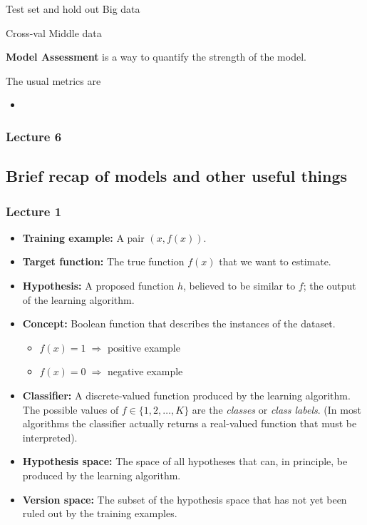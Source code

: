 \vspace{10pt}

Test set and hold out \ra Big data

Cross-val \ra Middle data

\textbf{Model Assessment} is a way to quantify the strength of the model.

The usual metrics are

\begin{itemize}
    \item 
\end{itemize}


\subsubsection{Lecture 6}













\subsection{Brief recap of models and other useful things}

\subsubsection{Lecture 1}

\begin{itemize}
    \item \textbf{Training example:} A pair $(x, f(x))$.
    \item \textbf{Target function:} The true function $f(x)$ that we want to estimate.
    \item \textbf{Hypothesis:} A proposed function $h$, believed to be similar to $f$; the output of the learning algorithm.
    \item \textbf{Concept:} Boolean function that describes the instances of the dataset.
          \begin{itemize}
              \item $f(x) = 1 \;\Rightarrow$ positive example
              \item $f(x) = 0 \;\Rightarrow$ negative example 
          \end{itemize}
    \item \textbf{Classifier:} A discrete-valued function produced by the learning algorithm.  
          The possible values of $f \in \{1,2,\dots,K\}$ are the \emph{classes} or \emph{class labels}.  
          (In most algorithms the classifier actually returns a real-valued function that must be interpreted).
    \item \textbf{Hypothesis space:} The space of all hypotheses that can, in principle, be produced by the learning algorithm.
    \item \textbf{Version space:} The subset of the hypothesis space that has not yet been ruled out by the training examples.
\end{itemize}


